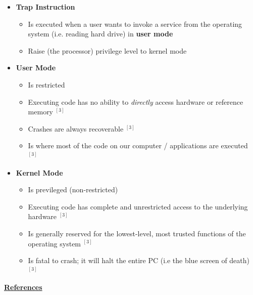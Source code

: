 \documentclass[12pt]{article}
\begin{document}
\begin{enumerate}[1.]
\begin{enumerate}[a)]
\begin{itemize}
            \item \textbf{Trap Instruction}

            \begin{itemize}
                \item Is executed when a user wants to invoke a service from the operating system (i.e. reading hard drive)
                in \textbf{user mode}
                \item Raise (the processor) privilege level to kernel mode
            \end{itemize}

            \item \textbf{User Mode}

            \begin{itemize}
                \item Is restricted
                \item Executing code has no ability to \textit{directly} access
                hardware or reference memory $^{[3]}$
                \item Crashes are always recoverable $^{[3]}$
                \item Is where most of the code on our computer / applications are executed $^{[3]}$
            \end{itemize}

            \item \textbf{Kernel Mode}
            \begin{itemize}
                \item Is previleged (non-restricted)
                \item Executing code has complete and unrestricted access to the underlying hardware $^{[3]}$
                \item Is generally reserved for the lowest-level, most trusted functions of the operating
                system $^{[3]}$
                \item Is fatal to crash; it will halt the entire PC (i.e the blue screen of death) $^{[3]}$
            \end{itemize}
        \end{itemize}

        \bigskip

        \underline{\textbf{References}}


\end{enumerate}
\end{enumerate}
\end{document}
